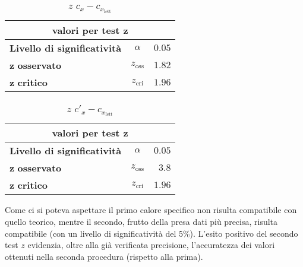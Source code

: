 \documentclass{article}
\begin{document}
	\begin{center}
		\begin{minipage}{0.48\textwidth}
			\begin{table}[H] \centering
				\begin{small}
					\begin{tabular}{@{}lcr@{}}\toprule
						\multicolumn{3}{c}{\textbf{valori per test} \(\boldsymbol{z}\)}\\ \midrule
						\textbf{Livello di significatività}		 &  \(\alpha\) &\(0.05\) \\  \hdashline
						\(\boldsymbol{z}\) \textbf{osservato}		& \(z_{\text{oss}}\)  &\(1.82\)\\ \hdashline
						\(\boldsymbol{z}\) \textbf{critico}		& \(z_{\text{cri}}\)  &\(1.96\)\\ 
						\bottomrule
					\end{tabular}
				\end{small}
				\caption{\(z\) \(c_{x} - c_{x_{\text{lett}}}\)}
			\end{table}
		\end{minipage}
		\hspace{0.3cm}
		\begin{minipage}{0.48\textwidth}
			\begin{table}[H] \centering
				\begin{small}
					\begin{tabular}{@{}lcr@{}}\toprule
						\multicolumn{3}{c}{\textbf{valori per test} \(\boldsymbol{z}\)}\\ \midrule
						\textbf{Livello di significatività}		 &  \(\alpha\) &\(0.05\) \\  \hdashline
						\(\boldsymbol{z}\) \textbf{osservato}		& \(z_{\text{oss}}\)  &\(3.8\)\\ \hdashline
						\(\boldsymbol{z}\) \textbf{critico}		& \(z_{\text{cri}}\)  &\(1.96\)\\ 
						\bottomrule
					\end{tabular}
				\end{small}
				\caption{\(z\) \(c'_{x} - c_{x_{\text{lett}}}\)}
			\end{table}
		\end{minipage}
	\end{center}
	
	Come ci si poteva aspettare il primo calore specifico non risulta compatibile con quello teorico, mentre il secondo, frutto della presa dati più precisa, risulta compatibile (con un livello di significatività del 5\%). L'esito positivo del secondo test \(z\) evidenzia, oltre alla già verificata precisione, l'accuratezza dei valori ottenuti nella seconda procedura (rispetto alla prima). 
	
\end{document}
